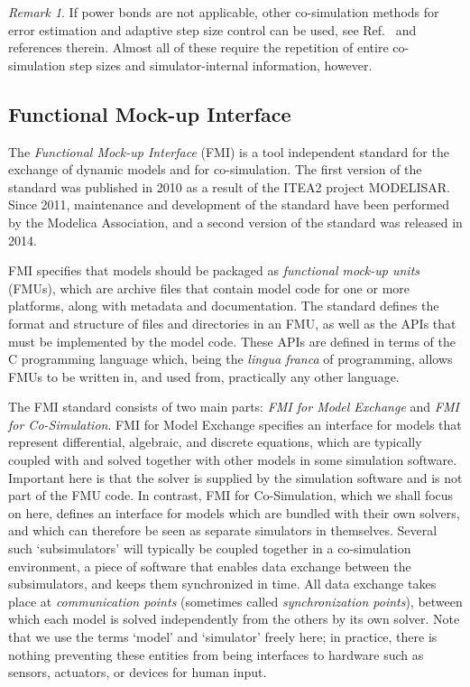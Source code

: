 \documentclass[prb,aps,showpacs,floatfix,twocolumn,10pt]{revtex4-1}
\newcommand{\sub}{subsimulator}
\theoremstyle{plain}
\theoremstyle{remark}
\newtheorem{remark}{Remark}[guideline]
\begin{document}
\begin{remark}
	If power bonds are not applicable, other co-simulation methods for error estimation and adaptive step size control can be used, see Ref.~ and references therein.
	Almost all of these require the repetition of entire co-simulation step sizes and simulator-internal information, however.\footnotemark[\value{footnote}]
\end{remark}


\subsection{Functional Mock-up Interface}
\label{subsec:interfaces:fmi}

The \emph{Functional Mock-up Interface} (FMI) is a tool independent standard for the exchange of dynamic models and for co-simulation.\cite{Blochwitz2011}
The first version of the standard was published in 2010 as a result of the ITEA2 project MODELISAR.
Since 2011, maintenance and development of the standard have been performed by the Modelica Association, and a second version of the standard was released in 2014.\cite{Blochwitz2012}

FMI specifies that models should be packaged as \emph{functional mock-up units} (FMUs), which are archive files that contain model code for one or more platforms, along with metadata and documentation.
The standard defines the format and structure of files and directories in an FMU, as well as the APIs that must be implemented by the model code.
These APIs are defined in terms of the C programming language which, being the \emph{lingua franca} of programming, allows FMUs to be written in, and used from, practically any other language.

The FMI standard consists of two main parts:
\emph{FMI for Model Exchange} and \emph{FMI for Co-Simulation}.
FMI for Model Exchange specifies an interface for models that represent differential, algebraic, and discrete equations, which are typically coupled with and solved together with other models in some simulation software.
Important here is that the solver is supplied by the simulation software and is not part of the FMU code.
In contrast, FMI for Co-Simulation, which we shall focus on here, defines an interface for models which are bundled with their own solvers, and which can therefore be seen as separate simulators in themselves.
Several such `\sub{}s' will typically be coupled together in a co-simulation environment, a piece of software that enables data exchange between the \sub{}s, and keeps them synchronized in time.
All data exchange takes place at \emph{communication points} (sometimes called \emph{synchronization points}), between which each model is solved independently from the others by its own solver.
Note that we use the terms `model' and `simulator' freely here; in practice, there is nothing preventing these entities from being interfaces to hardware such as sensors, actuators, or devices for human input.
\end{document}
